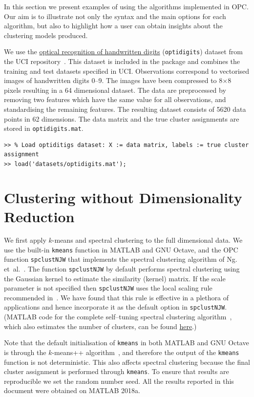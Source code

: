 \documentclass{book}
\begin{document}
In this section we present examples of using the algorithms
implemented in OPC. Our aim is to illustrate not only the syntax and the main options
for each algorithm, but also to highlight how a user can obtain insights about
the clustering models produced.

We use the \href{https://archive.ics.uci.edu/ml/datasets/optical+recognition+of+handwritten+digits}
{optical recognition of handwritten digits} ({\tt optidigits}) dataset
from the UCI repository~\cite{UCI}. This dataset is included in the package and
combines the training and test datasets specified in UCI. 
%
Observations correspond to
vectorised images of handwritten digits 0--9. The images have been compressed
to 8$\times$8 pixels resulting in a 64 dimensional dataset.
%
The data are preprocessed by removing two features which have the same value for all
observations, and standardising the remaining features. The resulting dataset consists of
5620 data points in 62 dimensions. The data matrix and the true cluster
assignments are stored in {\tt optidigits.mat}.

\begin{verbatim}
>> % Load optiditigs dataset: X := data matrix, labels := true cluster assignment
>> load('datasets/optidigits.mat');
\end{verbatim}


\section{Clustering without Dimensionality Reduction}

We first apply $k$-means and spectral clustering to the full dimensional data.
We use the built-in {\tt kmeans} function in MATLAB and GNU Octave, and the OPC
function {\tt spclustNJW} that implements the spectral clustering algorithm of
Ng.  et~al.~\cite{NgJW2001}. 
%
The function {\tt spclustNJW} by default performs spectral clustering using
the Gaussian kernel to estimate the similarity (kernel) matrix.
%
If the scale parameter is not specified then {\tt spclustNJW} uses the local scaling
rule recommended in~\cite{Zelnik2004}. We have found that this
rule is effective in a plethora of applications and hence incorporate it
as the default option in {\tt spclustNJW}. (MATLAB code for the complete
self--tuning spectral clustering algorithm~\cite{Zelnik2004},
which also
estimates the number of clusters, can be found
\href{http://lihi.eew.technion.ac.il/files/Demos/SelfTuningClustering.html}{here}.)

%
Note that the default initialisation of {\tt kmeans} in both MATLAB and GNU Octave
is through the $k$-means++ algorithm~\cite{ArthurV2007}, and
therefore the output of the {\tt kmeans} function is not deterministic. This also
affects spectral clustering because the final
cluster assignment is performed through {\tt kmeans}. To ensure that 
results are reproducible we set the random number
seed.
%
All the results reported in this document were obtained on MATLAB 2018a.
\end{document}
